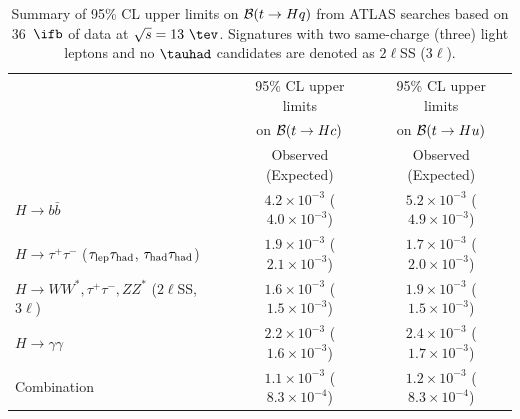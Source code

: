 \begin{table}[t!]
\begin{center}
\begin{tabular}{lcc}
\toprule\toprule
 & \multicolumn{1}{c}{95\% CL upper limits} & \multicolumn{1}{c}{95\% CL upper limits}  \\
 & \multicolumn{1}{c}{on $\mathcal{B}(t \to Hc)$} & \multicolumn{1}{c}{on $\mathcal{B}(t \to Hu)$} \\
 &  Observed (Expected) & Observed (Expected)  \\
\midrule\midrule
$H \to b\bar{b}$ & $4.2 \times 10^{-3}$ ($4.0 \times 10^{-3}$) & $5.2 \times 10^{-3}$ ($4.9 \times 10^{-3}$) \\
$H \to \tau^+\tau^-$ ($\tau_{\mathrm{lep}} \tau_{\mathrm{had}}$, $\tau_{\mathrm{had}} \tau_{\mathrm{had}}$) & $1.9 \times 10^{-3}$ ($2.1 \times 10^{-3}$) & $1.7 \times 10^{-3}$ ($2.0 \times 10^{-3}$) \\ 
$H \to WW^*, \tau^+\tau^-, ZZ^*$ ($2\ell$SS, $3\ell$)~\cite{Aaboud:2018pob}  & $1.6 \times 10^{-3}$ ($1.5 \times 10^{-3}$) & $1.9 \times 10^{-3}$ ($1.5 \times 10^{-3}$) \\ 
$H \to \gamma\gamma$~\cite{Aaboud:2017mfd} & $2.2 \times 10^{-3}$ ($1.6 \times 10^{-3}$) & $2.4 \times 10^{-3}$ ($1.7 \times 10^{-3}$) \\
\midrule
Combination  & $1.1 \times 10^{-3}$ ($8.3 \times 10^{-4}$) & $1.2 \times 10^{-3}$ ($8.3 \times 10^{-4}$) \\
\bottomrule\bottomrule
\end{tabular}
\caption{\small{Summary of 95\% CL upper limits on $\mathcal{B}(t \to Hq)$ from ATLAS searches based on 
36~$\ifb$ of data at $\sqrt{s}=13~\tev$. Signatures with two same-charge (three) light leptons and no $\tauhad$ candidates
are denoted as $2\ell$SS ($3\ell$). }}
\label{tab:limits_summary}
\end{center}
\end{table}

